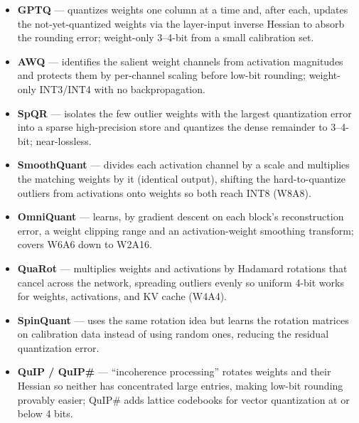\begin{itemize}

  \item \textbf{GPTQ} \cite{frantar2023gptq} --- quantizes weights one column at a time and, after each, updates the not-yet-quantized weights via the layer-input inverse Hessian to absorb the rounding error; weight-only 3--4-bit from a small calibration set.

  \item \textbf{AWQ} \cite{lin2024awq} --- identifies the salient weight channels from activation magnitudes and protects them by per-channel scaling before low-bit rounding; weight-only INT3/INT4 with no backpropagation.

  \item \textbf{SpQR} \cite{dettmers2024spqr} --- isolates the few outlier weights with the largest quantization error into a sparse high-precision store and quantizes the dense remainder to 3--4-bit; near-lossless.

  \item \textbf{SmoothQuant} \cite{xiao2023smoothquant} --- divides each activation channel by a scale and multiplies the matching weights by it (identical output), shifting the hard-to-quantize outliers from activations onto weights so both reach INT8 (W8A8).

  \item \textbf{OmniQuant} \cite{shao2024omniquant} --- learns, by gradient descent on each block's reconstruction error, a weight clipping range and an activation-weight smoothing transform; covers W6A6 down to W2A16.

  \item \textbf{QuaRot} \cite{ashkboos2024quarot} --- multiplies weights and activations by Hadamard rotations that cancel across the network, spreading outliers evenly so uniform 4-bit works for weights, activations, and KV cache (W4A4).

  \item \textbf{SpinQuant} \cite{liu2025spinquant} --- uses the same rotation idea but learns the rotation matrices on calibration data instead of using random ones, reducing the residual quantization error.

  \item \textbf{QuIP / QuIP\#} \cite{chee2023quip,tseng2024quipsharp} --- ``incoherence processing'' rotates weights and their Hessian so neither has concentrated large entries, making low-bit rounding provably easier; QuIP\# adds lattice codebooks for vector quantization at or below 4 bits.


\end{itemize}
